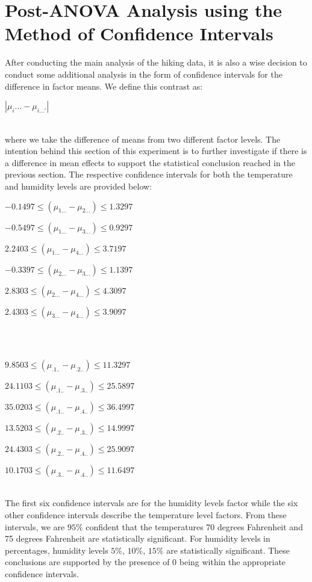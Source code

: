 \section{Post-ANOVA Analysis using the Method of Confidence Intervals}
After conducting the main analysis of the hiking data, it is also a wise decision to conduct some additional analysis in the form of confidence intervals for the difference in factor means. We define this contrast as:\\
\centerline{$|\mu_{i}... - \mu_{i...'}|$}\\
where we take the difference of means from two different factor levels. The intention behind this section of this experiment is to further investigate if there is a difference in mean effects to support the statistical conclusion reached in the previous section. The respective confidence intervals for both the temperature and humidity levels are provided below:\\
\centerline{$-0.1497 \leq (\mu_{1...} - \mu_{2...}) \leq 1.3297$}\newline
\centerline{$-0.5497 \leq (\mu_{1...} - \mu_{3...}) \leq 0.9297$}\newline
\centerline{$2.2403 \leq (\mu_{1...} - \mu_{4...}) \leq 3.7197$}\newline
\centerline{$-0.3397 \leq (\mu_{2...} - \mu_{3...}) \leq 1.1397$}\newline
\centerline{$2.8303 \leq (\mu_{2...} - \mu_{4...}) \leq 4.3097$}\newline
\centerline{$2.4303 \leq (\mu_{3...} - \mu_{4...}) \leq 3.9097$}\\\\
\centerline{$9.8503 \leq (\mu_{.1..} - \mu_{.2..}) \leq 11.3297$}\newline
\centerline{$24.1103 \leq (\mu_{.1..} - \mu_{.3..}) \leq 25.5897$}\newline
\centerline{$35.0203 \leq (\mu_{.1..} - \mu_{.4..}) \leq 36.4997$}\newline
\centerline{$13.5203 \leq (\mu_{.2..} - \mu_{.3..}) \leq 14.9997$}\newline
\centerline{$24.4303 \leq (\mu_{.2..} - \mu_{.4..}) \leq 25.9097$}\newline
\centerline{$10.1703 \leq (\mu_{.3..} - \mu_{.4..}) \leq 11.6497$}\\

The first six confidence intervals are for the humidity levels factor while the six other confidence intervals describe the temperature level factors. From these intervals, we are $95\%$ confident that the temperatures 70 degrees Fahrenheit and 75 degrees Fahrenheit are statistically significant. For humidity levels in percentages, humidity levels $5\%$, $10\%$, $15\%$ are statistically significant. These conclusions are supported by the presence of $0$ being within the appropriate confidence intervals. 